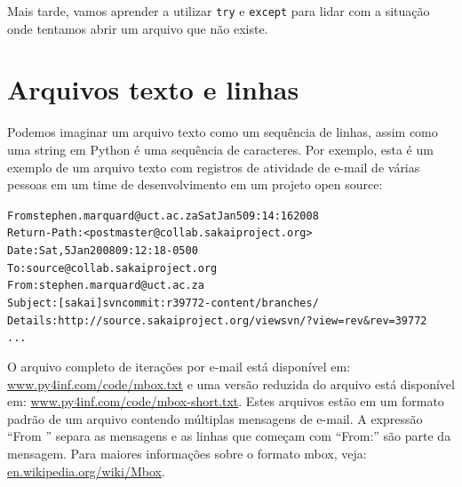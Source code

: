 Mais tarde, vamos aprender a utilizar {\tt try} e {\tt except} para lidar 
com a situação onde tentamos abrir um arquivo que não existe.

\section{Arquivos texto e linhas}

Podemos imaginar um arquivo texto como um sequência de linhas, assim
como uma string em Python é uma sequência de caracteres. Por exemplo, esta
é um exemplo de um arquivo texto com registros de atividade de e-mail de várias
pessoas em um time de desenvolvimento em um projeto open source:

\beforeverb
\begin{alltt}
From stephen.marquard@uct.ac.za Sat Jan  5 09:14:16 2008
Return-Path: <postmaster@collab.sakaiproject.org>
Date: Sat, 5 Jan 2008 09:12:18 -0500
To: source@collab.sakaiproject.org
From: stephen.marquard@uct.ac.za
Subject: [sakai] svn commit: r39772 - content/branches/
Details: http://source.sakaiproject.org/viewsvn/?view=rev\&rev=39772
...
\end{alltt}
\afterverb

O arquivo completo de iterações por e-mail está disponível em:
\url{www.py4inf.com/code/mbox.txt} 
e uma versão reduzida do arquivo está disponível em:
\url{www.py4inf.com/code/mbox-short.txt}.
Estes arquivos estão em um formato padrão de um arquivo contendo
múltiplas mensagens de e-mail. A expressão ``From '' separa as mensagens
e as linhas que começam com ``From:'' são parte da mensagem.
Para maiores informações sobre o formato mbox, veja:
\url{en.wikipedia.org/wiki/Mbox}. 

